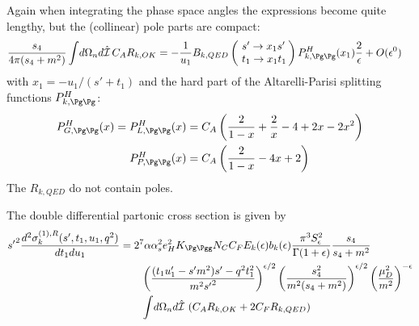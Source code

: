 Again when integrating the phase space angles the expressions become quite lengthy, but the (collinear) pole parts are compact:
\begin{align}
\frac{s_4}{4\pi(s_4+m^2)}\int\!d\Omega_n d\hat{\mathcal I}\,C_A R_{k,OK} &=-\frac 1 {u_1}B_{k,QED}\left(\!\begin{array}{l}s'\rightarrow x_1s'\\t_1\rightarrow x_1 t_1\end{array}\!\!\right) P^H_{k,\Pg\Pg}(x_1)\frac 2 \epsilon + O(\epsilon^0)
\end{align}
with $x_1 = -u_1/(s'+t_1)$ and the hard part of the Altarelli-Parisi splitting functions $P^H_{k,\Pg\Pg}$\cite{Altarelli:1977zs,Vogelsang:1995vh}:
\begin{align}
P^H_{G,\Pg\Pg}(x) = P^H_{L,\Pg\Pg}(x) &= C_A\left(\frac 2 {1-x} + \frac 2 x - 4 + 2x - 2x^2\right)\\
P^H_{P,\Pg\Pg}(x) &= C_A\left(\frac 2 {1-x} - 4x + 2\right)
\end{align}
The $R_{k,QED}$ do not contain poles.

The double differential partonic cross section is given by
\begin{align}
{s'}^2\frac{d^2\sigma_{k}^{(1),R}(s',t_1,u_1,q^2)}{dt_1du_1} &= 2^7\alpha\alpha_s^2 e_H^2 K_{\Pg\Pgg}N_CC_F E_k(\epsilon) b_k(\epsilon)\frac{\pi^3 S_\epsilon^2}{\Gamma(1+\epsilon)} \frac{s_4}{s_4+m^2}  \nonumber\\
 &\hspace{20pt} \left(\frac{(t_1u_1'-s'm^2)s' - q^2t_1^2}{m^2{s'}^2}\right)^{\epsilon/2} \left(\frac{s_4^2}{m^2(s_4+m^2)}\right)^{\epsilon/2} \left(\frac{\mu_D^2}{m^2}\right)^{-\epsilon} \nonumber\\
 &\hspace{20pt} \int\!d\Omega_n d\hat{\mathcal I}\,\left(C_A R_{k,OK} + 2C_F R_{k,QED}\right)
\end{align}

